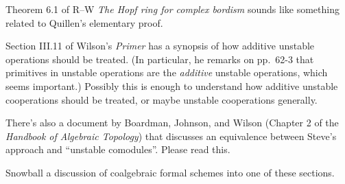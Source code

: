 Theorem 6.1 of R--W \textit{The Hopf ring for complex bordism} sounds like something related to Quillen's elementary proof.

Section III.11 of Wilson's \textit{Primer} has a synopsis of how additive unstable operations should be treated.  (In particular, he remarks on pp.\ 62-3 that primitives in unstable operations are the \emph{additive} unstable operations, which seems important.)  Possibly this is enough to understand how additive unstable cooperations should be treated, or maybe unstable cooperations generally.

There's also a document by Boardman, Johnson, and Wilson (Chapter 2 of the \textit{Handbook of Algebraic Topology}) that discusses an equivalence between Steve's approach and ``unstable comodules''.  Please read this.

Snowball a discussion of coalgebraic formal schemes into one of these sections.





